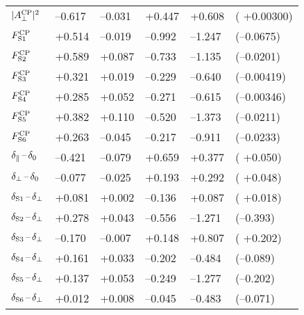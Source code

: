 \begin{table}[htbp]
\begin{tabular}{llllll}
    $\magperpAvSq$   &  --0.617  &  --0.031    &   +0.447  &   +0.608  &  ( +0.00300)                    \\
    $\FSAv[1]$       &   +0.514  &  --0.019    &  --0.992  &  --1.247  &  (--0.0675)                     \\
    $\FSAv[2]$       &   +0.589  &   +0.087    &  --0.733  &  --1.135  &  (--0.0201)                     \\
    $\FSAv[3]$       &   +0.321  &   +0.019    &  --0.229  &  --0.640  &  (--0.00419)                    \\
    $\FSAv[4]$       &   +0.285  &   +0.052    &  --0.271  &  --0.615  &  (--0.00346)                    \\
    $\FSAv[5]$       &   +0.382  &   +0.110    &  --0.520  &  --1.373  &  (--0.0211)                     \\
    $\FSAv[6]$       &   +0.263  &  --0.045    &  --0.217  &  --0.911  &  (--0.0233)                     \\
    \hline
    $\delparzero$    &  --0.421  &  --0.079    &   +0.659  &   +0.377  &  ( +0.050)                      \\
    $\delperpzero$   &  --0.077  &  --0.025    &   +0.193  &   +0.292  &  ( +0.048)                      \\
    $\delSperp[1]$   &   +0.081  &   +0.002    &  --0.136  &   +0.087  &  ( +0.018)                      \\
    $\delSperp[2]$   &   +0.278  &   +0.043    &  --0.556  &  --1.271  &  (--0.393)                      \\
    $\delSperp[3]$   &  --0.170  &  --0.007    &   +0.148  &   +0.807  &  ( +0.202)                      \\
    $\delSperp[4]$   &   +0.161  &   +0.033    &  --0.202  &  --0.484  &  (--0.089)                      \\
    $\delSperp[5]$   &   +0.137  &   +0.053    &  --0.249  &  --1.277  &  (--0.202)                      \\
    $\delSperp[6]$   &   +0.012  &   +0.008    &  --0.045  &  --0.483  &  (--0.071)                      \\
    \hline
  \end{tabular}
\end{table}
